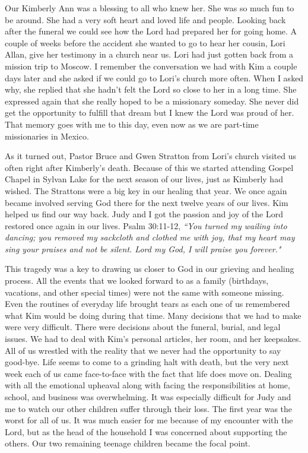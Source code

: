 \documentclass[oneside,12pt]{book}
\begin{document}
Our Kimberly Ann was a blessing to all who knew her. She was so much fun to be around. She had a very soft heart and loved life and people. Looking back after the funeral we could see how the Lord had prepared her for going home. A couple of weeks before the accident she wanted to go to hear her cousin, Lori Allan, give her testimony in a church near us. Lori had just gotten back from a mission trip to Moscow. I remember the conversation we had with Kim a couple days later and she asked if we could go to Lori's church more often. When I asked why, she replied that she hadn't felt the Lord so close to her in a long time. She expressed again that she really hoped to be a missionary someday. She never did get the opportunity to fulfill that dream but I knew the Lord was proud of her. That memory goes with me to this day, even now as we are part-time missionaries in Mexico.

As it turned out, Pastor Bruce and Gwen Stratton from Lori's church visited us often right after Kimberly's death. Because of this we started attending Gospel Chapel in Sylvan Lake for the next season of our lives, just as Kimberly had wished. The Strattons were a big key in our healing that year. We once again became involved serving God there for the next twelve years of our lives. Kim helped us find our way back. Judy and I got the passion and joy of the Lord restored once again in our lives. Psalm 30:11-12, \textit{``You turned my wailing into dancing; you removed my sackcloth and clothed me with joy, that my heart may sing your praises and not be silent. Lord my God, I will praise you forever."}

This tragedy was a key to drawing us closer to God in our grieving and healing process. All the events that we looked forward to as a family (birthdays, vacations, and other special times)  were not the same with someone missing. Even the routines of everyday life brought tears as each one of us remembered what Kim would be doing during that time. Many decisions that we had to make were very difficult. There were decisions about the funeral, burial, and legal issues. We had to deal with Kim's personal articles, her room, and her keepsakes. All of us wrestled with the reality that we never had the opportunity to say good-bye. Life seems to come to a grinding halt with death, but the very next week each of us came face-to-face with the fact that life does move on. Dealing with all the emotional upheaval along with facing the responsibilities at home, school, and business was overwhelming. It was especially difficult for Judy and me to watch our other children suffer through their loss. The first year was the worst for all of us. It was much easier for me because of my encounter with the Lord, but as the head of the household I was concerned about supporting the others. Our two remaining teenage children became the focal point.
\end{document}
